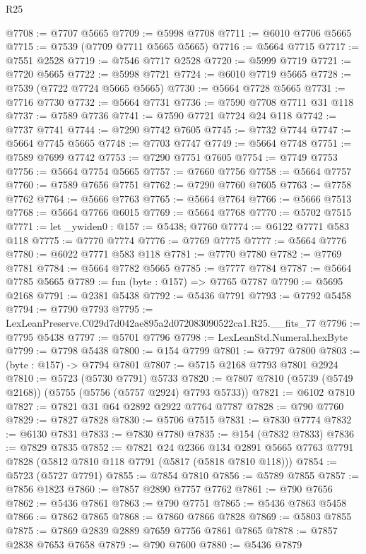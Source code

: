 \begin{lexlean}{R25}
\begin{coremodule}
@7708 := @7707 @5665
@7709 := @5998 @7708
@7711 := @6010 @7706 @5665
@7715 := @7539 (@7709 @7711 @5665 @5665)
@7716 := @5664 @7715
@7717 := @7551 @2528
@7719 := @7546 @7717 @2528
@7720 := @5999 @7719
@7721 := @7720 @5665
@7722 := @5998 @7721
@7724 := @6010 @7719 @5665
@7728 := @7539 (@7722 @7724 @5665 @5665)
@7730 := @5664 @7728 @5665
@7731 := @7716 @7730
@7732 := @5664 @7731
@7736 := @7590 @7708 @7711 @31 @118
@7737 := @7589 @7736
@7741 := @7590 @7721 @7724 @24 @118
@7742 := @7737 @7741
@7744 := @7290 @7742 @7605
@7745 := @7732 @7744
@7747 := @5664 @7745 @5665
@7748 := @7703 @7747
@7749 := @5664 @7748
@7751 := @7589 @7699 @7742
@7753 := @7290 @7751 @7605
@7754 := @7749 @7753
@7756 := @5664 @7754 @5665
@7757 := @7660 @7756
@7758 := @5664 @7757
@7760 := @7589 @7656 @7751
@7762 := @7290 @7760 @7605
@7763 := @7758 @7762
@7764 := @5666 @7763
@7765 := @5664 @7764
@7766 := @5666 @7513
@7768 := @5664 @7766 @6015
@7769 := @5664 @7768
@7770 := @5702 @7515
@7771 := let _ywiden0 : @157 := @5438; @7760
@7774 := @6122 @7771 @583 @118
@7775 := @7770 @7774
@7776 := @7769 @7775
@7777 := @5664 @7776
@7780 := @6022 @7771 @583 @118
@7781 := @7770 @7780
@7782 := @7769 @7781
@7784 := @5664 @7782 @5665
@7785 := @7777 @7784
@7787 := @5664 @7785 @5665
@7789 := fun (byte : @157) => @7765 @7787
@7790 := @5695 @2168
@7791 := @2381 @5438
@7792 := @5436 @7791
@7793 := @7792 @5458
@7794 := @7790 @7793
@7795 := LexLeanPreserve.C029d7d042ae895a2d072083090522ca1.R25.__fits_77
@7796 := @7795 @5438
@7797 := @5701 @7796
@7798 := LexLeanStd.Numeral.hexByte
@7799 := @7798 @5438
@7800 := @154 @7799
@7801 := @7797 @7800
@7803 := (byte : @157) -> @7794 @7801
@7807 := @5715 @2168 @7793 @7801 @2924
@7810 := @5723 (@5730 @7791) @5733
@7820 := @7807 @7810 (@5739 (@5749 @2168)) (@5755 (@5756 (@5757 @2924) @7793 @5733))
@7821 := @6102 @7810
@7827 := @7821 @31 @64 @2892 @2922 @7764 @7787
@7828 := @790 @7760
@7829 := @7827 @7828
@7830 := @5706 @7515
@7831 := @7830 @7774
@7832 := @6130 @7831
@7833 := @7830 @7780
@7835 := @154 (@7832 @7833)
@7836 := @7829 @7835
@7852 := @7821
    @24
    @2366
    @134
    @2891
    @5665
    @7763
    @7791
    @7828
    (@5812 @7810 @118 @7791 (@5817 (@5818 @7810 @118)))
@7854 := @5723 (@5727 @7791)
@7855 := @7854 @7810
@7856 := @5789 @7855
@7857 := @7856 @1823
@7860 := @7857 @2890 @7757 @7762
@7861 := @790 @7656
@7862 := @5436 @7861
@7863 := @790 @7751
@7865 := @5436 @7863 @5458
@7866 := @7862 @7865
@7868 := @7860 @7866 @7828
@7869 := @5803 @7855
@7875 := @7869 @2839 @2889 @7659 @7756 @7861 @7865
@7878 := @7857 @2838 @7653 @7658
@7879 := @790 @7600
@7880 := @5436 @7879

\end{coremodule}
\end{lexlean}
